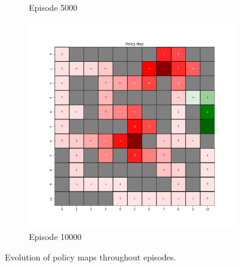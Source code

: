 \documentclass{assignment}
\begin{document}
\begin{figure}[H]
\begin{subfigure}{0.3\textwidth}
    \caption{Episode 5000}
    \end{subfigure}\hfill
    \begin{subfigure}{0.3\textwidth}
        \includegraphics[width=\textwidth]{figures/policy_td/epsilon_sweep/policy_alpha_0.1_gamma_0.95_epsilon_1.0_iteration_10000.png}
    \caption{Episode 10000}
    \end{subfigure}
    \caption{Evolution of policy maps throughout episodes.}
    \label{fig:epsilon_1.0_td_learning_policy}
\end{figure}
\end{document}
